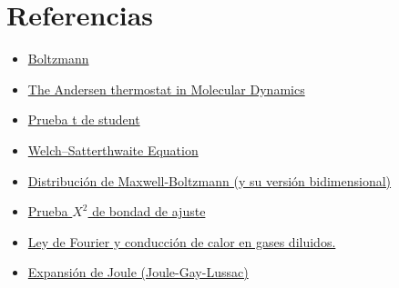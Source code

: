 \documentclass{article}
\begin{document}
\section{Referencias}
\begin{itemize}
    \item \href{https://www.bipm.org/en/measurement-units/si-defining-constants}{Boltzmann}
    \item \href{https://onlinelibrary.wiley.com/doi/abs/10.1002/cpa.20198}{The Andersen thermostat in Molecular Dynamics}
    \item \href{https://es.wikipedia.org/wiki/Prueba_t_de_Student}{Prueba t de student}
    \item \href{https://en.wikipedia.org/wiki/Welch%E2%80%93Satterthwaite_equation}{Welch–Satterthwaite Equation}
    \item \href{https://es.wikipedia.org/wiki/Distribuci%C3%B3n_de_Maxwell-Boltzmann}{Distribución de Maxwell-Boltzmann (y su versión bidimensional)}
    \item \href{https://es.wikipedia.org/wiki/Prueba_%CF%87%C2%B2}{Prueba $X^2$ de bondad de ajuste}
    \item \href{http://www.sc.ehu.es/sbweb/fisica_/transporte/cond_calor/conduccion/conduccion.html}{Ley de Fourier y conducción de calor en gases diluidos.}
    \item \href{https://es.wikipedia.org/wiki/Expansi%C3%B3n_libre}{Expansión de Joule (Joule-Gay-Lussac)}
\end{itemize} 
\end{document}
